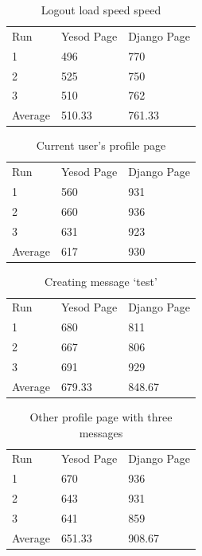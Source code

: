 \begin{table}[H]
	\caption{Logout load speed speed}
	\begin{center}
		\begin{tabular}{ | l | | l | l |}
			\hline
			Run & Yesod Page & Django Page \\
			1 & 496 & 770 \\
			2 & 525 & 750 \\
			3 & 510 & 762 \\
			Average & 510.33 & 761.33 \\
			\hline
		\end{tabular}
	\end{center}
	\label{tab:logoutLoadSpeeds}
\end{table}

\begin{table}[H]
	\caption{Current user's profile page}
	\begin{center}
		\begin{tabular}{ | l | | l | l |}
			\hline
			Run & Yesod Page & Django Page \\
			1 & 560 & 931 \\
			2 & 660 & 936 \\
			3 & 631 & 923 \\
			Average & 617 & 930 \\
			\hline
		\end{tabular}
	\end{center}
	\label{tab:currentProfileLoadSpeeds}
\end{table}

\begin{table}[H]
	\caption{Creating message `test'}
	\begin{center}
		\begin{tabular}{ | l | l | l |}
			\hline
			Run & Yesod Page & Django Page \\
			1 & 680 & 811 \\
			2 & 667 & 806 \\
			3 & 691 & 929 \\
			Average & 679.33 & 848.67 \\
			\hline
		\end{tabular}
	\end{center}
	\label{tab:createMessageLoadSpeeds}
\end{table}

\begin{table}[H]
	\caption{Other profile page with three messages}
	\begin{center}
		\begin{tabular}{ | l | l | l |}
			\hline
			Run & Yesod Page & Django Page \\
			1 & 670 & 936 \\
			2 & 643 & 931 \\
			3 & 641 & 859 \\
			Average & 651.33 & 908.67 \\
			\hline
		\end{tabular}
	\end{center}
	\label{tab:otherProfileLoadSpeeds}
\end{table}

